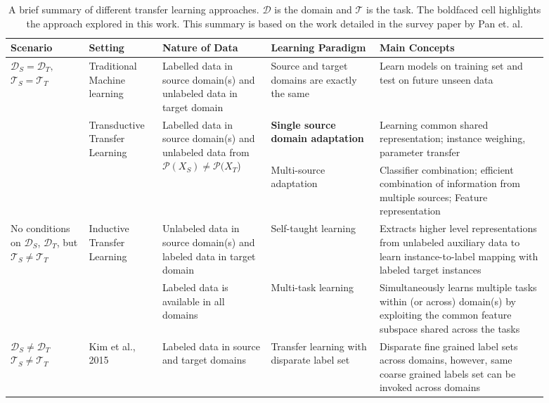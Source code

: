 \documentclass{sigkddExp}
\begin{document}
\begin{table}[th]
\begin{tabular*}{\linewidth}{m{0.13\linewidth}m{0.12\linewidth}m{0.18\linewidth}m{0.18\linewidth}m{0.28\linewidth}}
\toprule
\toprule
\textbf{Scenario} & \textbf{Setting} & \textbf{Nature of Data} & \textbf{Learning Paradigm} & \textbf{Main Concepts}  \\
\toprule 
 \makecell{$\mathcal{D}_S = \mathcal{D}_T,$\\$ \mathcal{T}_S = \mathcal{T}_T$}
& Traditional Machine learning
& Labelled data in source domain(s) and unlabeled data in target domain
& Source and target domains are exactly the same
& Learn models on training set and test on future unseen data \\
\cmidrule{1-5}
 \multirow{2}{\linewidth}{\textbf{\makecell{$\mathcal{D}_S \neq \mathcal{D}_T$,\\ $\mathcal{T}_S = \mathcal{T}_T$}}} 
& \multirow{2}{\linewidth}{Transductive Transfer Learning}
& \multirow{2}{\linewidth}{Labelled data in source domain(s) and unlabeled data from $\mathcal{P}(X_S) \neq \mathcal{P}(X_T$)}
& \textbf{Single source domain adaptation}
& Learning common shared representation; instance weighing, parameter transfer
\\
\cmidrule{4-5}
 
&
&
& Multi-source adaptation
& Classifier combination; efficient combination of information from multiple sources; Feature representation \\
\cmidrule{1-5} 

\multirow{2}{\linewidth}{No conditions on $\mathcal{D}_S$, $\mathcal{D}_T$, 
but $\mathcal{T}_S \neq \mathcal{T}_T$ }
& \multirow{2}{\linewidth}{Inductive Transfer Learning}
& Unlabeled data in source domain(s) and labeled data in target domain
& Self-taught learning
& Extracts higher level representations from unlabeled auxiliary data to learn instance-to-label mapping with labeled target instances
\\
\cmidrule{3-5} 
& & Labeled data is available in all domains
& Multi-task learning
& Simultaneously learns multiple tasks within (or across) domain(s) by exploiting the common feature subspace shared across the tasks \\
\cmidrule{1-5}
\makecell{$\mathcal{D}_S\neq \mathcal{D}_T$\\$\mathcal{T}_S \neq \mathcal{T}_T$}
& Kim et al., 2015 \cite{kim2015new}
& Labeled data in source and target domains
& Transfer learning with disparate label set
& Disparate fine grained label sets across domains, however, same coarse grained labels set can be invoked across domains
\\
\bottomrule
\end{tabular*}
\caption {A brief summary of different transfer learning approaches. $\mathcal{D}$ is the domain and $\mathcal{T}$ is the task. The boldfaced cell highlights the approach explored in this work. This summary is based on the work detailed in the survey paper by Pan et. al.\protect\cite{pan2010survey}}
\label{tab:related_work}
\end{table}
\end{document}
